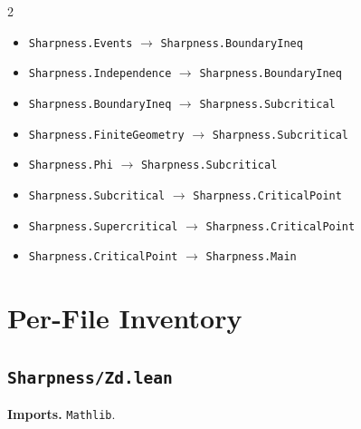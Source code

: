 \documentclass[10pt]{article}
\newcommand{\module}[1]{\texttt{#1}}
\begin{document}
\begin{multicols}{2}
\begin{itemize}
\item \module{Sharpness.Events} \(\to\) \module{Sharpness.BoundaryIneq}
\item \module{Sharpness.Independence} \(\to\) \module{Sharpness.BoundaryIneq}
\item \module{Sharpness.BoundaryIneq} \(\to\) \module{Sharpness.Subcritical}
\item \module{Sharpness.FiniteGeometry} \(\to\) \module{Sharpness.Subcritical}
\item \module{Sharpness.Phi} \(\to\) \module{Sharpness.Subcritical}
\item \module{Sharpness.Subcritical} \(\to\) \module{Sharpness.CriticalPoint}
\item \module{Sharpness.Supercritical} \(\to\) \module{Sharpness.CriticalPoint}
\item \module{Sharpness.CriticalPoint} \(\to\) \module{Sharpness.Main}
\end{itemize}
\end{multicols}
\section*{Per-File Inventory}
\subsection*{\module{Sharpness/Zd.lean}}
\textbf{Imports.} \module{Mathlib}.
\end{document}
